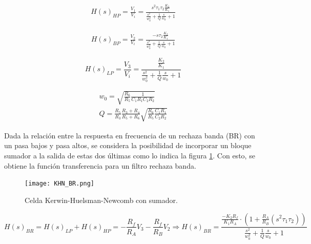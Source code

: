\begin{equation}
    \begin{split}
        H(s)_{HP} = \frac{V_{1}}{V_{i}} = \frac{s^{2} \tau_{1}\tau_{2} \frac{K_{2}}{K_{1}}}{\frac{s^{2}}{w_{0}^{2}} + \frac{1}{Q} \frac{s}{w_{0}} + 1}
    \end{split}
    \label{eq:KHN4}
\end{equation}

\begin{equation}
    \begin{split}
        H(s)_{BP} = \frac{V_{2}}{V_{i}} = \frac{-s \tau_{2} \frac{K_{2}}{K_{1}}}{\frac{s^{2}}{w_{0}^{2}} + \frac{1}{Q} \frac{s}{w_{0}} + 1}
    \end{split}
    \label{eq:KHN5}
\end{equation}

\begin{equation}
        H(s)_{LP} = \frac{V_{3}}{V_{i}} = \frac{\frac{K_{2}}{K_{1}}}{\frac{s^{2}}{w_{0}^{2}} + \frac{1}{Q} \frac{s}{w_{0}} + 1}
    \label{eq:KHN6}
\end{equation}


\begin{equation}
    \begin{matrix}
            
        w_{0} = \sqrt{\frac{R_{6}}{R_{5}} \frac{1}{C_{1}R_{1}C_{2}R_{2}}}\\

        Q = \frac{R_{5}}{R_{3}}\frac{R_{3} + R_{4}}{R_{5}+R_{6}}\sqrt{\frac{R_{6}}{R_{5}} \frac{C_{1}R_{1}}{C_{2}R_{2}}}
    \end{matrix}
    \label{eq:KHN7}
\end{equation}


Dada la relación entre la respuesta en frecuencia de un rechaza banda (BR) con un pasa bajos y pasa altos, se considera la posibilidad de incorporar un bloque sumador a la salida de estas dos últimas como lo indica la figura \ref{fig:KHN_BR}. Con esto, se obtiene la función transferencia para un filtro rechaza banda. 


\begin{figure}[H]
    \centering
    \texttt{[image: KHN\_BR.png]}
    \caption{Celda Kerwin-Huelsman-Newcomb con sumador.}
    \label{fig:KHN_BR}
\end{figure}

\begin{equation}
        H(s)_{BR} = H(s)_{LP}+H(s)_{HP} = -\frac{R_{f}}{R_{A}}V_{3} - \frac{R_{f}}{R_{B}}V_{2}
        \Rightarrow 
        H(s)_{BR} = \frac{\frac{- K_{2}R_{f}}{K_{1}R_{A}}\cdot (1+\frac{R_{A}}{R_{B}}(s^{2}\tau_{1}\tau_{2}))}{\frac{s^{2}}{w_{0}^{2}} + \frac{1}{Q} \frac{s}{w_{0}} + 1} 
    \label{eq:KHN8}
\end{equation}


